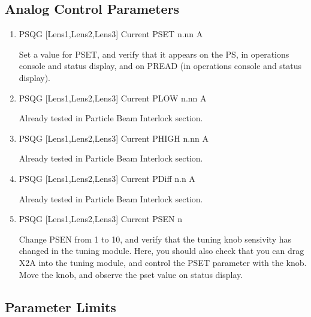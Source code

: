 \documentclass[11pt]{book}		%
\begin{document}
\color{black}


\subsection{Analog Control Parameters}\label{sect:cyc-equip-ctl-beamline-quad1-analog-control}

\begin{enumerate}
 \item PSQG [Lens1,Lens2,Lens3] Current PSET  n.nn A

\color{red}
Set a value for PSET, and verify that it appears on the PS, in operations console and status display, and on PREAD (in operations console and status display).
\color{black}

 \item PSQG [Lens1,Lens2,Lens3] Current PLOW  n.nn A

\color{red}
Already tested in Particle Beam Interlock section.
\color{black}

 \item PSQG [Lens1,Lens2,Lens3] Current PHIGH n.nn A

\color{red}
Already tested in Particle Beam Interlock section.
\color{black}

 \item PSQG [Lens1,Lens2,Lens3] Current PDiff n.n A

\color{red}
Already tested in Particle Beam Interlock section.
\color{black}

 \item PSQG [Lens1,Lens2,Lens3] Current PSEN  n

\color{red}

Change PSEN from 1 to 10, and verify that the tuning knob sensivity has changed in the tuning module. Here, you should also check that you can drag X2A into the tuning module, and control the PSET parameter with the knob. Move the knob, and observe the pset value on status display.

\color{black}

\end{enumerate}

\subsection{Parameter Limits} \label{sect:cyc-equip-ctl-beamline-quad1-analog-control-limits}
\end{document}
